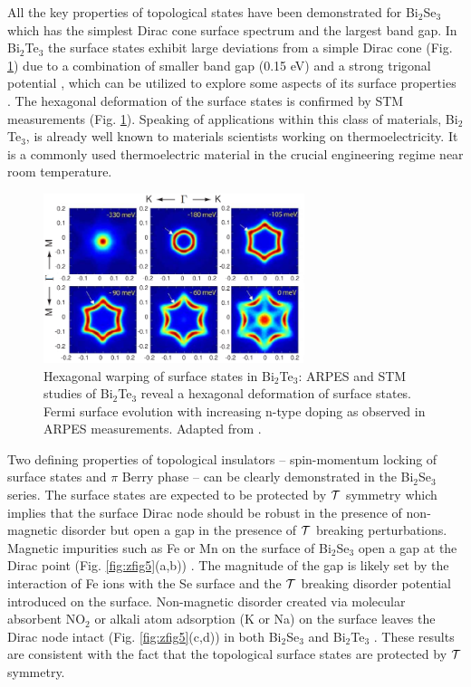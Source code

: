 \documentclass[twocolumn,floatfix,showpacs,rmp,aps]{revtex4}
\begin{document}
All the key properties of
topological states have been demonstrated for Bi$_2$Se$_3$ which has
the simplest Dirac cone surface spectrum and the largest band gap.
In Bi$_2$Te$_3$ the surface states exhibit large deviations
from a simple Dirac cone (Fig. \ref{fig:zfig8}) due to a combination of smaller
band gap (0.15 eV) and a strong trigonal potential \cite{chen09},
which can be utilized to explore some aspects
of its surface properties \cite{fu09,hasan09}.
The hexagonal deformation of the surface states is confirmed by STM
measurements \cite{alpichshev10} (Fig. \ref{fig:zfig8}).
Speaking of applications within this class of
materials, Bi$_2$Te$_3$, is already well known to materials
scientists working on thermoelectricity.  It is a commonly used
thermoelectric material in the crucial engineering regime near room
temperature.

\begin{figure}
\includegraphics[width=3in]{Fig14}
\caption{Hexagonal warping of
surface states in Bi$_2$Te$_3$: ARPES and STM studies of Bi$_2$Te$_3$
reveal a hexagonal deformation of surface states.  Fermi surface evolution with
increasing n-type doping as observed in ARPES measurements.  Adapted from
.}
\label{fig:zfig8}
\end{figure}

Two defining properties of topological insulators --
spin-momentum locking of surface states and $\pi$ Berry phase -- can
be clearly demonstrated in the Bi$_2$Se$_3$ series.
The surface states are expected to be protected by ${\cal T}$ symmetry
which implies that the surface Dirac node should be robust in
the presence of non-magnetic disorder but open a gap in the presence
of ${\cal T}$ breaking perturbations.
Magnetic impurities such as Fe or Mn on the surface of Bi$_2$Se$_3$ open a gap at the
Dirac point (Fig. \ref{fig:zfig5}(a,b)) \cite{xia08,hsieh09b,hor10b,wray10}.
The magnitude of the gap is
likely set by the interaction of Fe ions with the Se surface and the
${\cal T}$ breaking disorder potential introduced on the surface.
Non-magnetic disorder created via molecular absorbent NO$_2$ or
alkali atom adsorption (K or Na) on the surface leaves the Dirac node
intact (Fig. \ref{fig:zfig5}(c,d)) in both Bi$_2$Se$_3$ and Bi$_2$Te$_3$
\cite{xia09b,hsieh09b}. These results
are consistent with the fact that the topological surface states are
protected by ${\cal T}$ symmetry.
\end{document}
